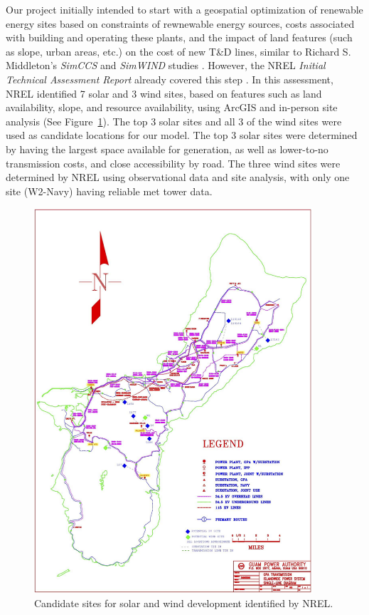 \documentclass[12pt,letterpaper,fleqn]{article}
\begin{document}
Our project initially intended to start with a geospatial optimization
of renewable energy sites based on constraints of rewnewable energy
sources, costs associated with building and operating these plants,
and the impact of land features (such as slope, urban areas, etc.) on
the cost of new T\&D lines, similar to Richard S. Middleton's
\emph{SimCCS} and \emph{SimWIND} studies \cite{middleton09,
  phillips12}. However, the NREL \emph{Initial Technical Assessment
  Report} already covered this step \cite{misty}. In this assessment,
NREL identified 7 solar and 3 wind sites, based on features such as
land availability, slope, and resource availability, using ArcGIS and
in-person site analysis (See Figure~\ref{fig:sites}). The top
3 solar sites and all 3 of the wind sites were used as candidate
locations for our model. The top 3 solar sites were determined by
having the largest space available for generation, as well as lower-to-no 
transmission costs, and close accessibility by road. The three wind sites
were determined by NREL using observational data and site analysis,
with only one site (W2-Navy) having reliable met tower data.

\begin{figure}[!h]
  \centering
  \includegraphics[width=0.925\textwidth]{img/sites}
  \caption{Candidate sites for solar and wind development identified by
    NREL.}
  \label{fig:sites}
\end{figure}
\end{document}
